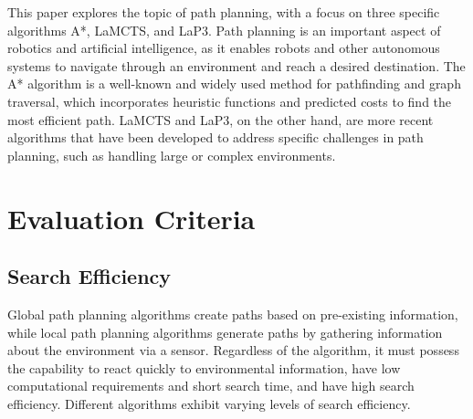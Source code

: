 \documentclass[bibliography=totoc]{scrartcl}
\begin{document}
This paper explores the topic of path planning, with a focus on three specific algorithms A*, LaMCTS, and LaP3. 
Path planning is an important aspect of robotics and artificial intelligence, as it enables robots and other autonomous systems to navigate through an environment and reach a desired destination. 
The A* algorithm is a well-known and widely used method for pathfinding and graph traversal, which incorporates heuristic functions and predicted costs to find the most efficient path. 
LaMCTS and LaP3, on the other hand, are more recent algorithms that have been developed to address specific challenges in path planning, such as handling large or complex environments.

\section{Evaluation Criteria} \label{corner_detection}

\subsection{Search Efficiency}

Global path planning algorithms create paths based on pre-existing information, while local path planning algorithms generate paths by gathering information about the environment via a sensor. 
Regardless of the algorithm, it must possess the capability to react quickly to environmental information, have low computational requirements and short search time, and have high search efficiency. Different algorithms exhibit varying levels of search efficiency.
\end{document}
